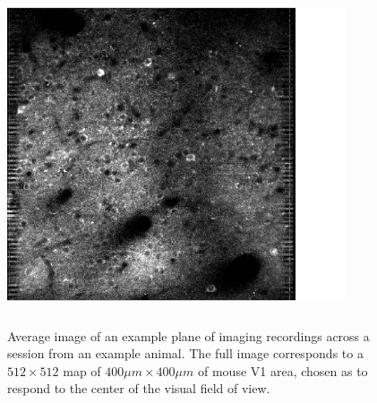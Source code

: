 \begin{figure}[H] \centering \includegraphics[width=10cm,height=10cm,keepaspectratio]{Figures/7.Results/ftraces/CM006.png} 
\caption{Average image of an example plane of imaging recordings across a session from an example animal. The full image corresponds to a $512\times 512$ map of $400 \mu m \times 400 \mu m$ of mouse V1 area, chosen as to respond to the center of the visual field of view.
\label{cm006}}
\end{figure}